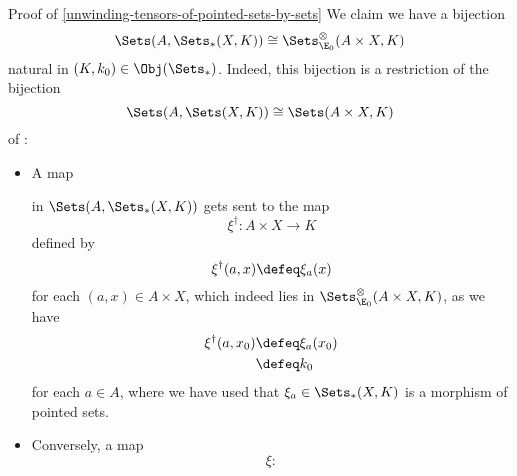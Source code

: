 \begin{Proof}{Proof of \cref{unwinding-tensors-of-pointed-sets-by-sets}}%
    We claim we have a bijection
    \[
        \Sets(A,\Sets_{*}(X,K))%
        \cong%
        \Sets^{\otimes}_{\E_{0}}(A\times X,K)%
    \]%
    natural in $(K,k_{0})\in\Obj(\Sets_{*})$. Indeed, this bijection is a restriction of the bijection
    \[
        \Sets(A,\Sets(X,K))%
        \cong
        \Sets(A\times X,K)%
    \]%
    of :%
    \begin{itemize}
        \item A map
            \begin{webcompile}
                \phantom{\xi\colon}
            \end{webcompile}
            in $\Sets(A,\Sets_{*}(X,K))$ gets sent to the map
            \[
                \xi^{\dagger}%
                \colon%
                A\times X%
                \to%
                K%
            \]%
            defined by
            \[
                \xi^{\dagger}(a,x)%
                \defeq%
                \xi_{a}(x)%
            \]%
            for each $(a,x)\in A\times X$, which indeed lies in $\Sets^{\otimes}_{\E_{0}}(A\times X,K)$, as we have%
            \begin{align*}
                \xi^{\dagger}(a,x_{0}) &\defeq \xi_{a}(x_{0})\\%
                                       &\defeq k_{0}%
            \end{align*}
            for each $a\in A$, where we have used that $\xi_{a}\in\Sets_{*}(X,K)$ is a morphism of pointed sets.
        \item Conversely, a map
            \[
                \xi%
                \colon%
\]
\end{itemize}
\end{Proof}
